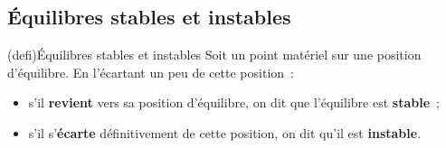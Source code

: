 \documentclass[../../main/main.tex]{subfiles}
\begin{document}
\subsection{Équilibres stables et instables}

\begin{tcb*}(defi){Équilibres stables et instables}
	Soit un point matériel sur une position d'équilibre. En l'écartant un peu de
	cette position~:
	\begin{itemize}
		\item s'il \textbf{revient} vers sa position d'équilibre, on dit que
		      l'équilibre est \textbf{stable}~;
		\item s'il s'\textbf{écarte} définitivement de cette position, on dit
		      qu'il est \textbf{instable}.
	\end{itemize}
	\begin{minipage}{0.45\linewidth}
		\begin{center}
			\vspace{-15pt}
		\end{center}
	\end{minipage}
	\hfill
	\begin{minipage}{0.45\linewidth}
		\begin{center}
			\vspace{-15pt}
		\end{center}
	\end{minipage}
\end{tcb*}
\end{document}
